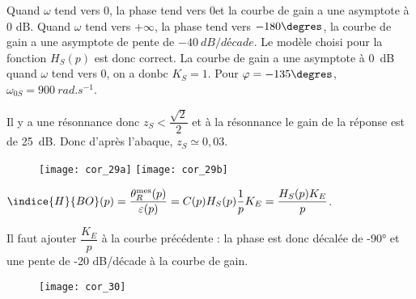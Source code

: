 \ifprof
\begin{corrige}
Quand $\omega$ tend vers 0, la phase tend vers 0\degres et la courbe de gain a une asymptote à 0 dB.
Quand $\omega$ tend vers $+\infty$, la phase tend vers $-180\degres$, la courbe de gain a une asymptote de pente de $-\SI{40}{dB/décade}$.
Le modèle choisi pour la fonction $H_S (p)$ est donc correct.
La courbe de gain a une asymptote à \SI{0}{dB} quand $\omega$ tend vers 0, on a donbc  $K_S=1$.
Pour $\varphi=-135\degres$, $\omega_{0S}=\SI{900}{rad.s^{-1}}$.

Il y a une résonnance donc $z_S<\dfrac{\sqrt{2}}{2}$ et à la résonnance le gain de la réponse est de \SI{25}{dB}. Donc d’après l’abaque, $z_S\simeq 0,03$.


\begin{figure}[H]
\centering
\texttt{[image: cor\_29a]}
\hfill
\texttt{[image: cor\_29b]}
\end{figure}

\end{corrige}
\else
\fi


\ifprof
\begin{corrige}
$\indice{H}{BO} (p)=\dfrac{\theta_R^{\text{mes}} (p)}{\varepsilon(p)} =C(p) H_S (p) \dfrac{1}{p} K_E=\dfrac{H_S (p)K_E}{p}$.

Il faut  ajouter $\dfrac{K_E}{p}$ à la courbe précédente : la phase est donc décalée de -90° et une pente de -20 dB/décade à la courbe de gain.

\begin{figure}[H]
\centering
\texttt{[image: cor\_30]}
\end{figure}
\end{corrige}
\else
\fi

